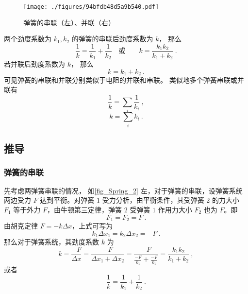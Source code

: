 

\begin{figure}[ht]
\centering
\texttt{[image: ./figures/94bfdb48d5a9b540.pdf]}
\caption{弹簧的串联（左）、并联（右）} \label{fig_Spring_2}
\end{figure}
两个劲度系数为 $k_1, k_2$ 的弹簧的串联后劲度系数为 $k$， 那么
\begin{equation}
\frac{1}{k} = \frac{1}{k_1} + \frac{1}{k_2}
\quad \text{或} \qquad
k = \frac{k_1 k_2}{k_1 + k_2}~.
\end{equation}
若并联后劲度系数为 $k$， 那么
\begin{equation}
k = k_1 + k_2~.
\end{equation}
可见弹簧的串联和并联分别类似于电阻的并联和串联。 类似地多个弹簧串联或并联有
\begin{equation}\label{eq_Spring_2}
\frac{1}{k} = \sum_i \frac{1}{k_i}~,
\end{equation}
\begin{equation}\label{eq_Spring_3}
k = \sum_i k_i~.
\end{equation}

\subsection{推导}
\subsubsection{弹簧的串联}
先考虑两弹簧串联的情况，
如\autoref{fig_Spring_2} 左，对于弹簧的串联，设弹簧系统两边受力 $F$ 达到平衡。对弹簧 $1$ 受力分析，由平衡条件，其受弹簧 $2$ 的力大小 $F_1$ 等于外力 $F$，由牛顿第三定律，弹簧 $2$ 受弹簧 $1$ 作用力大小 $F_2$ 也为 $F$。即
\begin{equation}
F_1=F_2=F~.
\end{equation}
由胡克定律 $F=-k\Delta x$，上式可写为
\begin{equation}
k_1\Delta x_1=k_2\Delta x_2=-F~.
\end{equation}
那么对于弹簧系统，其劲度系数 $k$ 为
\begin{equation}
k=\frac{-F}{\Delta x}=\frac{-F}{\Delta x_1+\Delta x_2}=\frac{-F}{\frac{-F}{k_1}+\frac{-F}{k_1}}=\frac{k_1k_2}{k_1+k_2}~,
\end{equation}
或者
\begin{equation}
\frac{1}{k}=\frac{1}{k_1}+\frac{1}{k_2}~.
\end{equation}

